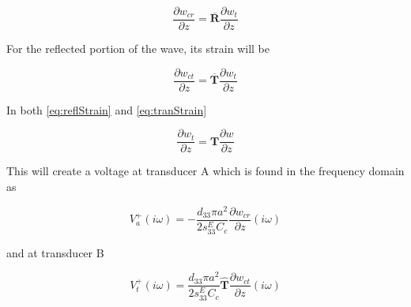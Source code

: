   \begin{equation}
  \frac{\partial w_{cr}}{\partial z} = \overline{\boldsymbol{R}}\frac{\partial w_t}{\partial z}
  \label{eq:reflStrain}
  \end{equation}
  
  For the reflected portion of the wave, its strain will be
  
    \begin{equation}
    \frac{\partial w_{ct}}{\partial z} = \overline{\boldsymbol{T}}\frac{\partial w_t}{\partial z}
    \label{eq:tranStrain}
    \end{equation}
    
    In both \ref{eq:reflStrain} and \ref{eq:tranStrain}
    
    \begin{equation}
    \frac{\partial w_t}{\partial z} = \boldsymbol{T} \frac{\partial w}{\partial z}
    \end{equation}
    
    
    
    This will create a voltage at transducer A which is found in the frequency domain as
    
    \begin{equation}
    V^+_a(i\omega) = -\frac{d_{33} \pi a^2}{2 s^E_{33} C_c} \frac{\partial w_{cr}}{\partial z} (i\omega)
    \end{equation}
    
    and at transducer B
    
    \begin{equation}
    V^+_t(i\omega) = \frac{d_{33} \pi a^2}{2 s^E_{33} C_c} \boldsymbol{\hat{T}}\frac{\partial w_{ct}}{\partial z} (i\omega)
    \end{equation}
    
    